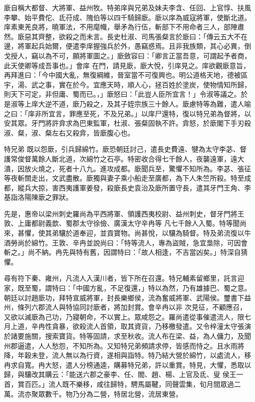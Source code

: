 \begin{pinyinscope}
 廞自稱大都督、大將軍、益州牧。特弟庠與兄弟及妹夫李含、任回、上官惇、扶風李攀、始平費佗、氐苻成、隗伯等以四千騎歸廞。廞以庠為威寇將軍，使斷北道。庠素東羌良將，曉軍法，不用麾幟，舉矛為行伍，斬部下不用命者三人，部陣肅然。廞惡其齊整，欲殺之而未言。長史杜淑、司馬張粲言於廞曰：「傳云五大不在邊，將軍起兵始爾，便遣李庠握強兵於外，愚竊惑焉。且非我族類，其心必異，倒戈授人，竊以為不可，願將軍圖之。」廞斂容曰：「卿言正當吾意，可謂起予者商，此天使卿等成吾事也。」會庠
 在門，請見廞，廞大悅，引庠見之。庠欲觀廞意旨，再拜進曰：「今中國大亂，無復綱維，晉室當不可復興也。明公道格天地，德被區宇，湯、武之事，實在於今。宜應天時，順人心，拯百姓於塗炭，使物情知所歸，則天下可定，非但庸、蜀而已。，」廞怒曰：「此豈人臣所宜言！」令淑等議之。於是淑等上庠大逆不道，廞乃殺之，及其子姪宗族三十餘人。廞慮特等為難，遣人喻之曰：「庠非所宜言，罪應至死，不及兄弟。」以庠尸還特，復以特兄弟為督將，以安其眾。牙門將許弇求為巴東監軍，杜淑、張粲固執不許。弇怒，於廞閣下手刃殺淑、粲，淑、粲左右又殺弇，皆廞腹心也。



 特兄弟
 既以怨廞，引兵歸綿竹。廞恐朝廷討己，遣長史費遠、犍為太守李苾、督護常俊督萬餘人斷北道，次綿竹之石亭。特密收合得七千餘人，夜襲遠軍，遠大潰，因放火燒之，死者十八九。進攻成都。廞聞兵至，驚懼不知所為。李苾、張征等夜斬關走出，文武盡散。廞獨與妻子乘小船走至廣都，為下人朱竺所殺。特至成都，縱兵大掠，害西夷護軍姜發，殺廞長史袁治及廞所置守長，遣其牙門王角、李基詣洛陽陳廞之罪狀。



 先是，惠帝以梁州刺史羅尚為平西將軍、領護西夷校尉、益州刺史，督牙門將王敦、上庸都尉義歆、蜀郡太守徐儉、廣漢太守辛冉等
 凡七千餘人入蜀。特等聞尚來，甚懼，使其弟驤於道奉迎，並貢寶物。尚甚悅，以驤為騎督。特及弟流復以牛酒勞尚於綿竹。王敦、辛冉並說尚曰：「特等流人，專為盜賊，急宜梟除，可因會斬之。」尚不納。冉先與特有舊，因謂特曰：「故人相逢，不吉當凶矣。」特深自猜懼。



 尋有符下秦、雍州，凡流人入漢川者，皆下所在召還。特兄輔素留鄉里，託言迎家，既至蜀，謂特曰：「中國方亂，不足復還，」特以為然，乃有雄據巴、蜀之意。朝廷以討趙廞功，拜特宣威將軍，封長樂鄉侯，流為奮威將軍、武陽侯。璽書下益州，條列六郡流人與特協同討廞者，將加封賞。會辛冉以非
 次見征，不顧應召，又欲以滅廞為己功，乃寢朝命，不以實上。眾咸怨之。羅尚遣從事催遣流人，限七月上道，辛冉性貪暴，欲殺流人首領，取其資貨，乃移檄發遣。又令梓潼太守張演於諸要施關，搜索寶貨。特等固請，求至秋收。流人布在梁、益，為人傭力，及聞州郡逼遣，人人愁怨，不知所為。又知特兄弟頻請求停，皆感而恃之。且水雨將降，年穀未登，流人無以為行資，遂相與詣特。特乃結大營於綿竹，以處流人，移冉求自寬。冉大怒，遣人分榜通逵，購募特兄弟，許以重賞。特見，大懼，悉取以歸，與驤改其購云：「能送六郡之豪李、任、閻、趙、楊、上官及氐、叟
 侯王一首，賞百匹。」流人既不樂移，咸往歸特，騁馬屬鞬，同聲雲集，旬月間眾過二萬。流亦聚眾數千。物乃分為二營，特居北營，流居東營。




\end{pinyinscope}
